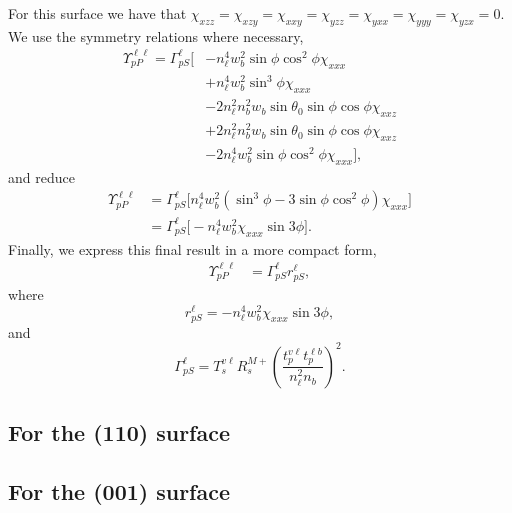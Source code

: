 For this surface we have that
$\chi_{xzz}=\chi_{xzy}=\chi_{xxy}=\chi_{yzz}=\chi_{yxx}=\chi_{yyy}=
\chi_{yzx}=0$. We use the symmetry relations where necessary,
\begin{equation*}
\begin{split}
\Upsilon^{\ell\ell}_{pP} =
\Gamma^{\ell}_{pS}
\big[
&- n^{4}_{\ell}w^{2}_{b}\sin\phi\cos^{2}\phi\chi_{xxx}\\
&+ n^{4}_{\ell}w^{2}_{b}\sin^{3}\phi\chi_{xxx}\\
&- 2n^{2}_{\ell}n^{2}_{b}w_{b}\sin\theta_{0}\sin\phi\cos\phi\chi_{xxz}\\
&+ 2n^{2}_{\ell}n^{2}_{b}w_{b}\sin\theta_{0}\sin\phi\cos\phi\chi_{xxz}\\
&- 2n^{4}_{\ell}w^{2}_{b}\sin\phi\cos^{2}\phi\chi_{xxx}
\big],
\end{split}
\end{equation*}
and reduce
\begin{equation*}
\begin{split}
\Upsilon^{\ell\ell}_{pP} &=
\Gamma^{\ell}_{pS}
\big[
n^{4}_{\ell}w^{2}_{b}(\sin^{3}\phi - 3\sin\phi\cos^{2}\phi)\chi_{xxx}
\big]\\
&=
\Gamma^{\ell}_{pS}
\big[
-n^{4}_{\ell}w^{2}_{b}\chi_{xxx}\sin3\phi
\big].
\end{split}
\end{equation*}
Finally, we express this final result in a more compact form,
\begin{equation}
\begin{split}
\Upsilon^{\ell\ell}_{pP} &=
\Gamma^{\ell}_{pS}
r^{\ell}_{pS},
\end{split}
\end{equation}
where
\begin{equation}
r^{\ell}_{pS} = -n^{4}_{\ell}w^{2}_{b}\chi_{xxx}\sin3\phi,
\end{equation}
and
\begin{equation}
\Gamma^{\ell}_{pS} = T_{s}^{v\ell}R^{M+}_{s}
\left(\frac{t^{v\ell}_{p}t^{\ell b}_{p}}{n^{2}_{\ell}n_{b}}\right)^{2}.
\end{equation}

\subsection{For the (110) surface}


\subsection{For the (001) surface}


